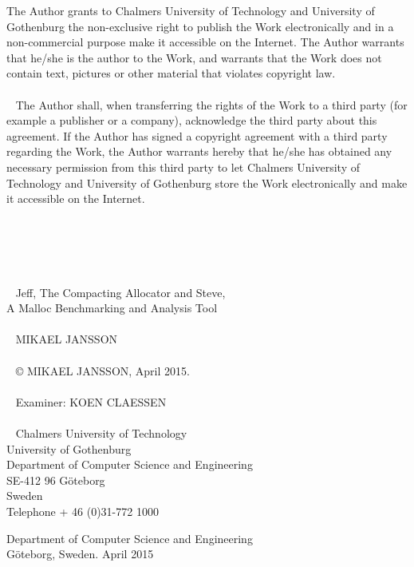 \noindent
The Author grants to Chalmers University of Technology and University of Gothenburg  the non-exclusive right to publish the Work electronically and in a non-commercial purpose make it accessible on the Internet. 
The Author warrants that he/she is the author to the Work, and warrants that the Work does not contain text, pictures or other material that violates copyright law. \\
\\ ~
\noindent
The Author shall, when transferring the rights of the Work to a third party (for example a publisher or a company), acknowledge the third party about this agreement. If the Author has signed a copyright agreement with a third party regarding the Work, the Author warrants hereby that he/she has obtained any necessary permission from this third party to let Chalmers University of Technology and University of Gothenburg  store the Work electronically and make it accessible on the Internet. \\
\\ ~
\\ ~
\\ ~
\\ ~
\\ ~
\noindent
Jeff, The Compacting Allocator and Steve, \\
A Malloc Benchmarking and Analysis Tool \\
\\ ~
MIKAEL JANSSON \\
\\ ~
© MIKAEL JANSSON, April 2015. \\
\\ ~
Examiner: KOEN CLAESSEN \\
\\ ~
\noindent
Chalmers University of Technology \\
University of Gothenburg \\
Department of Computer Science and Engineering \\
SE-412 96 Göteborg \\
Sweden \\
Telephone + 46 (0)31-772 1000 \\


\newpage{}
\thispagestyle{empty}

\noindent
Department of Computer Science and Engineering \\
Göteborg, Sweden. April 2015

\newpage{}
\thispagestyle{empty}


